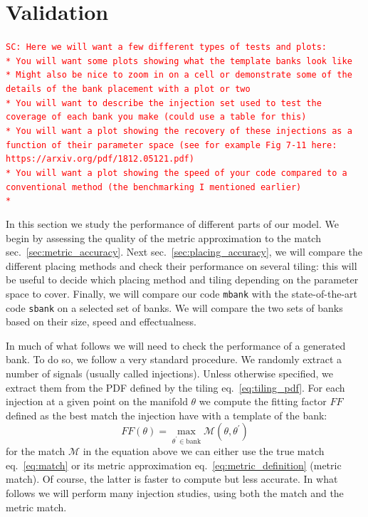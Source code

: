 \documentclass[twocolumn,showpacs,preprintnumbers,nofootinbib,prd,
superscriptaddress,10pt]{revtex4-1}
\newcommand{\sarah}[1]{{\textcolor{red}{\texttt{SC: #1}} }}
\begin{document}
\section{Validation} \label{sec:validation}

\sarah{Here we will want a few different types of tests and plots:\\
* You will want some plots showing what the template banks look like\\
* Might also be nice to zoom in on a cell or demonstrate some of the details of the bank placement with a plot or two\\
* You will want to describe the injection set used to test the coverage of each bank you make (could use a table for this)\\
* You will want a plot showing the recovery of these injections as a function of their parameter space (see for example Fig 7-11 here: https://arxiv.org/pdf/1812.05121.pdf)\\
* You will want a plot showing the speed of your code compared to a conventional method (the benchmarking I mentioned earlier) \\
* 
 }

In this section we study the performance of different parts of our model. We begin by assessing the quality of the metric approximation to the match sec.~\ref{sec:metric_accuracy}.
Next sec.~\ref{sec:placing_accuracy}, we will compare the different placing methods and check their performance on several tiling: this will be useful to decide which placing method and tiling depending on the parameter space to cover.
Finally, we will compare our code \texttt{mbank} with the state-of-the-art code \texttt{sbank} \cite{} on a selected set of banks. We will compare the two sets of banks based on their size, speed and effectualness.

In much of what follows we will need to check the performance of a generated bank. To do so, we follow a very standard procedure. We randomly extract a number of signals (usually called injections). Unless otherwise specified, we extract them from the PDF defined by the tiling eq.~\eqref{eq:tiling_pdf}.
For each injection at a given point on the manifold $\theta$ we compute the fitting factor $FF$ defined as the best match the injection have with a template of the bank:
\begin{equation}\label{eq:FF}
	FF(\theta) = \max_{\theta^\prime \in \text{bank}} \mathcal{M}(\theta, \theta^\prime)
\end{equation}
for the match $\mathcal{M}$ in the equation above we can either use the true match eq.~\eqref{eq:match} or its metric approximation eq.~\eqref{eq:metric_definition} (metric match).
Of course, the latter is faster to compute but less accurate. In what follows we will perform many injection studies, using both the match and the metric match.
\end{document}
